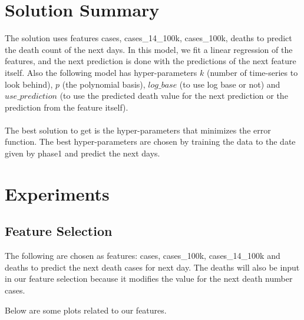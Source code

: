 \section{Solution Summary}

The solution uses features cases, cases\_14\_100k, cases\_100k, deaths to predict the death count of the next days. In this model, we fit a linear regression of the features, and the next prediction is done with the predictions of the next feature itself. Also the following model has hyper-parameters $k$ (number of time-series to look behind), $p$ (the polynomial basis), $log\_base$ (to use log base or not) and $use\_prediction$ (to use the predicted death value for the next prediction or the prediction from the feature itself).\\~\\
The best solution to get is the hyper-parameters that minimizes the error function. The best hyper-parameters are chosen by training the data to the date given by phase1 and predict the next days.
\section{Experiments}

\subsection*{Feature Selection}

The following are chosen as features: cases, cases\_100k, cases\_14\_100k and deaths to predict the next death cases for next day. The deaths will also be input in our feature selection because it modifies the value for the next death number cases.

Below are some plots related to our features.

